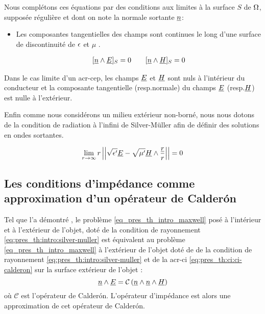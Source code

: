 Nous complétons ces équations par des conditions aux limites à la surface $S$ de $\Omega$, supposée régulière et dont on note la normale sortante $\underline{n}$:
\begin{itemize}
  \item Les composantes tangentielles des champs sont continues le long d'une surface de discontinuité de $\epsilon$ et $\mu$ \cite[(2.10) p.~8]{senior_approximate_1995}.

  \begin{align}
  \label{eq_pres_th_intro_transmissions}[\underline{n} \wedge \underline{E}]_S = 0  \qquad [\underline{n} \wedge \underline{H}]_S = 0
  \end{align}
\end{itemize}
Dans le cas limite d'un \gls{acr-cep}, les champs $\underline{E}$ et $\underline{H}$ sont nuls à l'intérieur du conducteur et la composante tangentielle (resp.normale) du champs $\underline{E}$ (resp.$\underline{H}$) est nulle à l'extérieur.


Enfin comme nous considérons un milieu extérieur non-borné, nous nous dotons de la condition de radiation à l'infini de Silver-Müller afin de définir des solutions en ondes sortantes.


\begin{equation}
\label{eq:pres_th:intro:silver-muller}
\lim_{r\rightarrow\infty}r\left|\left|\sqrt{\epsilon'}\underline{E} - \sqrt{\mu'}\underline{H}\wedge\dfrac{\underline{r}}{r}\right|\right| = 0
\end{equation} 

\subsection*{Les conditions d'impédance comme approximation d'un opérateur de Calderón}

Tel que l'a démontré \cite[Theorem 1., p.~1042]{lafitte_diffraction_1998}, le problème \eqref{eq_pres_th_intro_maxwell}  posé à l'intérieur et à l'extérieur de l'objet, doté de la condition de rayonnement \eqref{eq:pres_th:intro:silver-muller} est équivalent au problème \eqref{eq_pres_th_intro_maxwell} à l'extérieur de l'objet doté de de la condition de rayonnement \eqref{eq:pres_th:intro:silver-muller} et de la \gls{acr-ci} \eqref{eq:pres_th:ci:ci-calderon} sur la surface extérieur de l'objet : 
\begin{equation}
\label{eq:pres_th:ci:ci-calderon}
\underline{n} \wedge \underline{E} = \mathcal{C}\left(\underline{n} \wedge \underline{n} \wedge \underline{H}\right)
\end{equation}
où $ \mathcal{C}$ est l'opérateur de Calderón.
L'opérateur d'impédance est alors une approximation de cet opérateur de Calderón.

